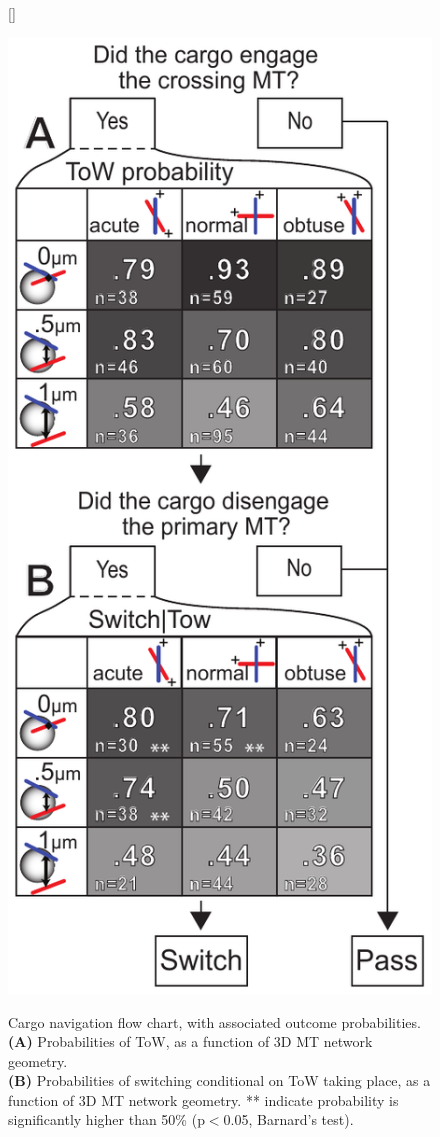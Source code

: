 \begin{figure}
[\FBwidth]
{\caption[Cargo navigation flow chart, with associated outcome probabilities]{Cargo navigation flow chart, with associated outcome probabilities. \\
\textbf{(A)} Probabilities of ToW, as a function of 3D MT network geometry. \\
\textbf{(B)} Probabilities of switching conditional on ToW taking place, as a function of 3D MT network geometry. ** indicate probability is significantly higher than 50\% (p$<$0.05, Barnard's test).} \label{fig:3}}
{\includegraphics{project1/Fig_3FINAL}}
\end{figure}

